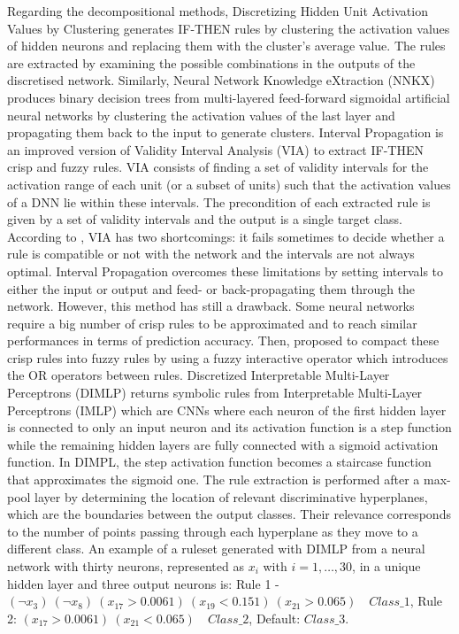 \documentclass[final,1p,times]{elsarticle}
\begin{document}
Regarding the decompositional methods, Discretizing Hidden Unit Activation Values by Clustering \cite{setiono1995understanding} generates IF-THEN rules by clustering the activation values of hidden neurons and replacing them with the cluster's average value. The rules are extracted by examining the possible combinations in the outputs of the discretised network. Similarly, Neural Network Knowledge eXtraction (NNKX) \cite{bondarenko2017classification} produces binary decision trees from multi-layered feed-forward sigmoidal artificial neural networks by clustering the activation values of the last layer and propagating them back to the input to generate clusters.
Interval Propagation \cite{palade2001interpretation} is an improved version of Validity Interval Analysis (VIA) \cite{thrun1995extracting} to extract IF-THEN crisp and fuzzy rules. VIA consists of finding a set of validity intervals for the activation range of each unit (or a subset of units) such that the activation values of a DNN lie within these intervals. The precondition of each extracted rule is given by a set of validity intervals and the output is a single target class. According to \cite{palade2001interpretation}, VIA has two shortcomings: it fails sometimes to decide whether a rule is compatible or not with the network and the intervals are not always optimal. Interval Propagation overcomes these limitations by setting intervals to either the input or output and feed- or back-propagating them through the network. However, this method has still a drawback. Some neural networks require a big number of crisp rules to be approximated and to reach similar performances in terms of prediction accuracy. Then, \cite{palade2001interpretation} proposed to compact these crisp rules into fuzzy rules by using a fuzzy interactive operator which introduces the OR operators between rules.
Discretized Interpretable Multi-Layer Perceptrons (DIMLP) \cite{bologna2017characterization,bologna1998symbolic,bologna2018rule, bologna2018comparison} returns symbolic rules from Interpretable Multi-Layer Perceptrons (IMLP) which are CNNs where each neuron of the first hidden layer is connected to only an input neuron and its activation function is a step function while the remaining hidden layers are fully connected with a sigmoid activation function. In DIMPL, the step activation function becomes a staircase function that approximates the sigmoid one. The rule extraction is performed after a max-pool layer by determining the location of relevant discriminative hyperplanes, which are the boundaries between the output classes. Their relevance corresponds to the number of points passing through each hyperplane as they move to a different class. An example of a ruleset generated with DIMLP from a neural network with thirty neurons, represented as $x_i$ with $i=1, \ldots, 30$, in a unique hidden layer and three output neurons is: Rule 1 - $(\neg x_3)\ (\neg x_8)\ (x_{17} > 0.0061)\ (x_{19} < 0.151)\ (x_{21} > 0.065) \quad Class\_1$, \quad Rule 2: $(x_{17} > 0.0061)\ (x_{21} < 0.065) \quad Class\_2$, \quad Default: $Class\_3$.
\end{document}
